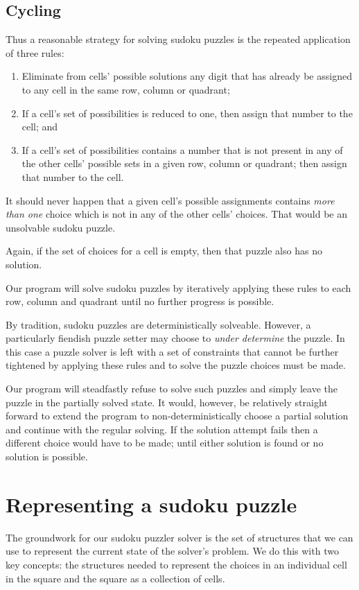 \subsection{Cycling}
\label{su:cycle}
Thus a reasonable strategy for solving sudoku puzzles is the repeated application of three rules:
\begin{enumerate}
\item
Eliminate from cells' possible solutions any digit that has already be assigned to any cell in the same row, column or quadrant;
\item
If a cell's set of possibilities is reduced to one, then assign that number to the cell; and
\item
If a cell's set of possibilities contains a number that is not present in any of the other cells' possible sets in a given row, column or quadrant; then assign that number to the cell.
\end{enumerate}
\begin{aside}
It should never happen that a given cell's possible assignments contains \emph{more than one} choice which is not in any of the other cells' choices. That would be an unsolvable sudoku puzzle.

Again, if the set of choices for a cell is empty, then that puzzle also has no solution.
\end{aside}
Our program will solve sudoku puzzles by iteratively applying these rules to each row, column and quadrant until no further progress is possible.

By tradition, sudoku puzzles are deterministically solveable. However, a particularly fiendish puzzle setter may choose to \emph{under determine} the puzzle. In this case a puzzle solver is left with a set of constraints that cannot be further tightened by applying these rules and to solve the puzzle choices must be made.

Our program will steadfastly refuse to solve such puzzles and simply leave the puzzle in the partially solved state. It would, however, be relatively straight forward to extend the program to non-deterministically choose a partial solution and continue with the regular solving. If the solution attempt fails then a different choice would have to be made; until either solution is found or no solution is possible.

\section{Representing a sudoku puzzle}
The groundwork for our sudoku puzzler solver is the set of structures that we can use to represent the current state of the solver's problem. We do this with two key concepts: the structures needed to represent the choices in an individual cell in the square and the square as a collection of cells.

